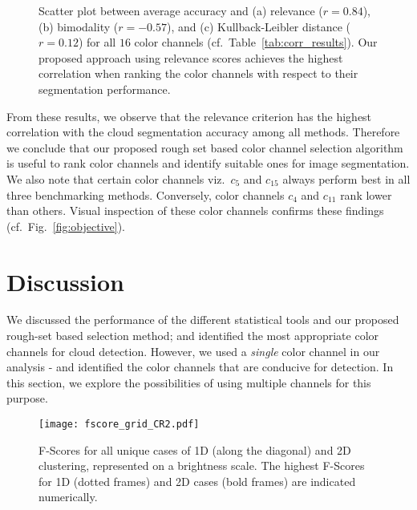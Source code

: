 \begin{figure}[htbp]
\centering
{}
\caption[Scatter plot between average accuracy and different benchmarking measures, while ranking the different color channels.]{Scatter plot between average accuracy and (a) relevance ($r=0.84$), (b) bimodality ($r=-0.57$), and (c) Kullback-Leibler distance ($r=0.12$) for all $16$ color channels (cf.\ Table~\ref{tab:corr_results}). Our proposed approach using relevance scores  achieves the highest correlation when ranking the color channels with respect to their segmentation performance.} 
\label{fig:corr}
\end{figure}

From these results, we observe that the relevance criterion has the highest correlation with the cloud segmentation accuracy among all methods. Therefore we conclude that our proposed rough set based color channel selection algorithm is useful to rank  color channels and identify suitable ones for image segmentation. We also note that certain color channels viz.\ $c_5$ and $c_{15}$ always perform best in all three benchmarking methods. Conversely, color channels $c_4$ and $c_{11}$ rank lower than others. Visual inspection of these color channels confirms these findings (cf.\ Fig.~\ref{fig:objective}). 

\section{Discussion}
We discussed the performance of the different statistical tools and our proposed rough-set based selection method; and identified the most appropriate color channels for cloud detection. However, we used a \emph{single} color channel in our analysis - and identified the color channels that are conducive for detection. In this section, we explore the possibilities of using multiple channels for this purpose.

\begin{figure}[htbp]
\centering
\texttt{[image: fscore\_grid\_CR2.pdf]}
\caption[F-score values of $16$ color channels for 1D and 2D clustering cases.]{F-Scores for all unique cases of 1D (along the diagonal) and 2D clustering, represented on a brightness scale.  The highest F-Scores for 1D (dotted frames) and 2D cases (bold frames) are indicated numerically.
\label{fig:2d_result}}
\end{figure}

